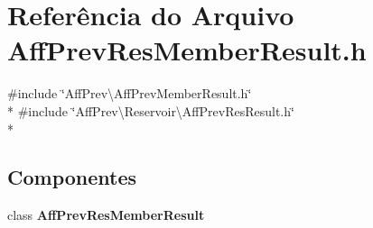 \section{Referência do Arquivo Aff\+Prev\+Res\+Member\+Result.\+h}
\label{_aff_prev_res_member_result_8h}
{\ttfamily \#include \char`\"{}Aff\+Prev\textbackslash{}\+Aff\+Prev\+Member\+Result.\+h\char`\"{}}\\*
{\ttfamily \#include \char`\"{}Aff\+Prev\textbackslash{}\+Reservoir\textbackslash{}\+Aff\+Prev\+Res\+Result.\+h\char`\"{}}\\*
\subsection*{Componentes}
\begin{DoxyCompactItemize}
\item 
class {\bf Aff\+Prev\+Res\+Member\+Result}
\end{DoxyCompactItemize}

